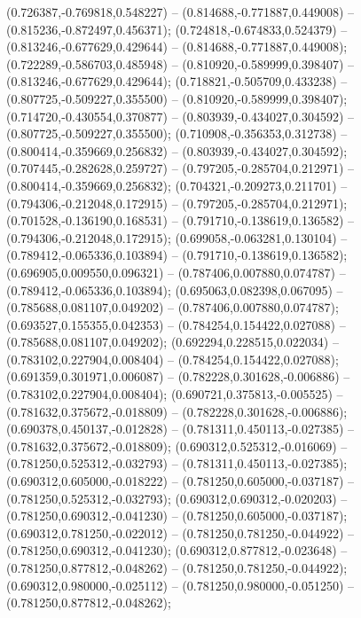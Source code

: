  (0.726387,-0.769818,0.548227) -- (0.814688,-0.771887,0.449008) -- (0.815236,-0.872497,0.456371);
 (0.724818,-0.674833,0.524379) -- (0.813246,-0.677629,0.429644) -- (0.814688,-0.771887,0.449008);
 (0.722289,-0.586703,0.485948) -- (0.810920,-0.589999,0.398407) -- (0.813246,-0.677629,0.429644);
 (0.718821,-0.505709,0.433238) -- (0.807725,-0.509227,0.355500) -- (0.810920,-0.589999,0.398407);
 (0.714720,-0.430554,0.370877) -- (0.803939,-0.434027,0.304592) -- (0.807725,-0.509227,0.355500);
 (0.710908,-0.356353,0.312738) -- (0.800414,-0.359669,0.256832) -- (0.803939,-0.434027,0.304592);
 (0.707445,-0.282628,0.259727) -- (0.797205,-0.285704,0.212971) -- (0.800414,-0.359669,0.256832);
 (0.704321,-0.209273,0.211701) -- (0.794306,-0.212048,0.172915) -- (0.797205,-0.285704,0.212971);
 (0.701528,-0.136190,0.168531) -- (0.791710,-0.138619,0.136582) -- (0.794306,-0.212048,0.172915);
 (0.699058,-0.063281,0.130104) -- (0.789412,-0.065336,0.103894) -- (0.791710,-0.138619,0.136582);
 (0.696905,0.009550,0.096321) -- (0.787406,0.007880,0.074787) -- (0.789412,-0.065336,0.103894);
 (0.695063,0.082398,0.067095) -- (0.785688,0.081107,0.049202) -- (0.787406,0.007880,0.074787);
 (0.693527,0.155355,0.042353) -- (0.784254,0.154422,0.027088) -- (0.785688,0.081107,0.049202);
 (0.692294,0.228515,0.022034) -- (0.783102,0.227904,0.008404) -- (0.784254,0.154422,0.027088);
 (0.691359,0.301971,0.006087) -- (0.782228,0.301628,-0.006886) -- (0.783102,0.227904,0.008404);
 (0.690721,0.375813,-0.005525) -- (0.781632,0.375672,-0.018809) -- (0.782228,0.301628,-0.006886);
 (0.690378,0.450137,-0.012828) -- (0.781311,0.450113,-0.027385) -- (0.781632,0.375672,-0.018809);
 (0.690312,0.525312,-0.016069) -- (0.781250,0.525312,-0.032793) -- (0.781311,0.450113,-0.027385);
 (0.690312,0.605000,-0.018222) -- (0.781250,0.605000,-0.037187) -- (0.781250,0.525312,-0.032793);
 (0.690312,0.690312,-0.020203) -- (0.781250,0.690312,-0.041230) -- (0.781250,0.605000,-0.037187);
 (0.690312,0.781250,-0.022012) -- (0.781250,0.781250,-0.044922) -- (0.781250,0.690312,-0.041230);
 (0.690312,0.877812,-0.023648) -- (0.781250,0.877812,-0.048262) -- (0.781250,0.781250,-0.044922);
 (0.690312,0.980000,-0.025112) -- (0.781250,0.980000,-0.051250) -- (0.781250,0.877812,-0.048262);
